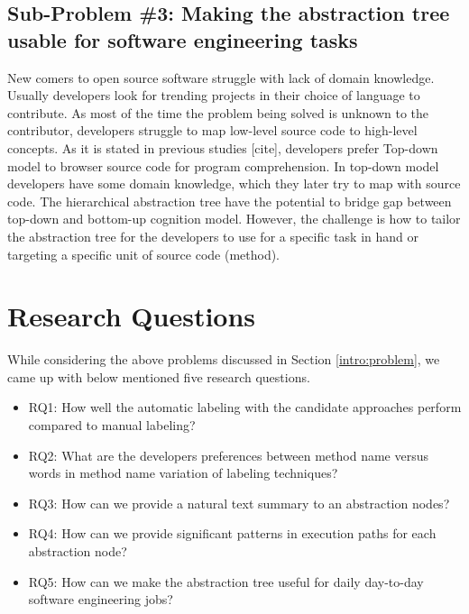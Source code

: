    

    \subsection{Sub-Problem \#3: Making the abstraction tree usable for software engineering tasks} 
    
    New comers to open source software struggle with lack of domain knowledge. Usually developers look for trending projects in their choice of language to contribute. As most of the time the problem being solved is unknown to the contributor, developers struggle to map low-level source code to high-level concepts. As it is stated in previous studies [cite], developers prefer Top-down model to browser source code for program comprehension. In top-down model developers have some domain knowledge, which they later try to map with source code. The hierarchical abstraction tree have the potential to bridge gap between top-down and bottom-up cognition model. However, the challenge is how to tailor the abstraction tree for the developers to use for a specific task in hand or targeting a specific unit of source code (method). 
    
    
\section{Research Questions}   
\label{intro:research_questions}
While considering the above problems discussed in Section \ref{intro:problem}, we came up with below mentioned five research questions.
\begin{itemize}
    \item RQ1: How well the automatic labeling with the candidate approaches perform compared to manual labeling?
    \item RQ2: What are the developers preferences between method name versus words in method name variation of labeling techniques?
    \item RQ3: How can we provide a natural text summary to an abstraction nodes?
    \item RQ4: How can we provide significant patterns in execution paths for each abstraction node?
    \item RQ5: How can we make the abstraction tree useful for daily day-to-day software engineering jobs?
    
\end{itemize}

